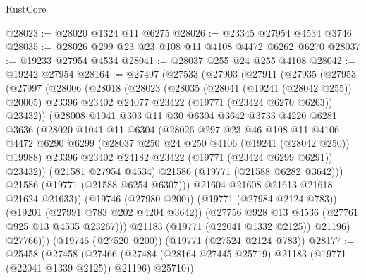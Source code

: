 \begin{lexlean}{RustCore}
\begin{coremodule}
@28023 := @28020 @1324 @11 @6275
@28026 := @23345 @27954 @4534 @3746
@28035 := @28026 @299 @23 @23 @108 @11 @4108 @4472 @6262 @6270
@28037 := @19233 @27954 @4534
@28041 := @28037 @255 @24 @255 @4108
@28042 := @19242 @27954
@28164 := @27497
    (@27533
      (@27903
        (@27911
          (@27935
            (@27953
              (@27997
                (@28006
                  (@28018
                    (@28023
                      (@28035
                        (@28041 (@19241 (@28042 @255)) @20005)
                        @23396
                        @23402
                        @24077
                        @23422
                        (@19771 (@23424 @6270 @6263))
                        @23432))
                    (@28008
                      @1041
                      @303
                      @11
                      @30
                      @6304
                      @3642
                      @3733
                      @4220
                      @6281
                      @3636
                      (@28020
                        @1041
                        @11
                        @6304
                        (@28026
                          @297
                          @23
                          @46
                          @108
                          @11
                          @4106
                          @4472
                          @6290
                          @6299
                          (@28037 @250 @24 @250 @4106 (@19241 (@28042 @250)) @19988)
                          @23396
                          @23402
                          @24182
                          @23422
                          (@19771 (@23424 @6299 @6291))
                          @23432))
                      (@21581 @27954 @4534)
                      @21586
                      (@19771 (@21588 @6282 @3642)))
                    @21586
                    (@19771 (@21588 @6254 @6307)))
                  @21604
                  @21608
                  @21613
                  @21618
                  @21624
                  @21633))
              (@19746 (@27980 @200))
              (@19771 (@27984 @2124 @783))
              (@19201 (@27991 @783 @202 @4204 @3642))
              (@27756 @928 @13 @4536 (@27761 @925 @13 @4535 @23267)))
            @21183
            (@19771 (@22041 @1332 @2125))
            @21196)
          @27766)))
    (@19746 (@27520 @200))
    (@19771 (@27524 @2124 @783))
@28177 := @25458
    (@27458
      (@27466 (@27484 (@28164 @27445 @25719) @21183 (@19771 (@22041 @1339 @2125)) @21196) @25710))

\end{coremodule}
\end{lexlean}

